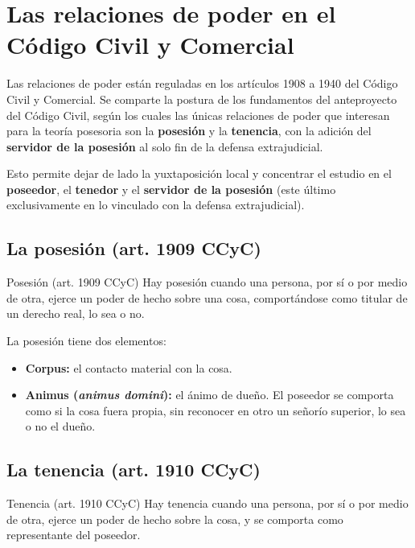 \documentclass[12pt,oneside]{book}
\begin{document}
\section{Las relaciones de poder en el Código Civil y Comercial}

Las relaciones de poder están reguladas en los artículos 1908 a 1940 del Código Civil y Comercial. Se comparte la postura de los fundamentos del anteproyecto del Código Civil, según los cuales las únicas relaciones de poder que interesan para la teoría posesoria son la \textbf{posesión} y la \textbf{tenencia}, con la adición del \textbf{servidor de la posesión} al solo fin de la defensa extrajudicial.

Esto permite dejar de lado la yuxtaposición local y concentrar el estudio en el \textbf{poseedor}, el \textbf{tenedor} y el \textbf{servidor de la posesión} (este último exclusivamente en lo vinculado con la defensa extrajudicial).

\subsection{La posesión (art. 1909 CCyC)}

\begin{definition}{Posesión (art. 1909 CCyC)}
Hay posesión cuando una persona, por sí o por medio de otra, ejerce un poder de hecho sobre una cosa, comportándose como titular de un derecho real, lo sea o no.
\end{definition}

La posesión tiene dos elementos:

\begin{itemize}
    \item \textbf{Corpus:} el contacto material con la cosa.
    \item \textbf{Animus (\textit{animus domini}):} el ánimo de dueño. El poseedor se comporta como si la cosa fuera propia, sin reconocer en otro un señorío superior, lo sea o no el dueño.
\end{itemize}

\subsection{La tenencia (art. 1910 CCyC)}

\begin{definition}{Tenencia (art. 1910 CCyC)}
Hay tenencia cuando una persona, por sí o por medio de otra, ejerce un poder de hecho sobre la cosa, y se comporta como representante del poseedor.
\end{definition}
\end{document}
